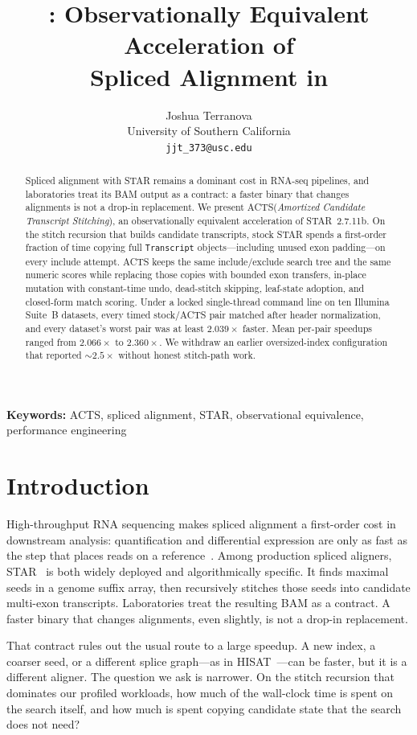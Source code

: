 \documentclass[11pt]{article}
\title{\ACTS: Observationally Equivalent Acceleration of\\
Spliced Alignment in \STAR}
\author{
  Joshua Terranova\\
  University of Southern California\\
  \texttt{jjt\_373@usc.edu}
}
\date{}
\newcommand{\STAR}{STAR\xspace}
\newcommand{\ACTS}{ACTS\xspace}
\newcommand{\Transcript}{\texttt{Transcript}\xspace}
\begin{document}
\maketitle

\begin{abstract}
Spliced alignment with \STAR remains a dominant cost in RNA-seq pipelines, and
laboratories treat its BAM output as a contract: a faster binary that changes
alignments is not a drop-in replacement.
We present \ACTS (\emph{Amortized Candidate Transcript Stitching}), an
observationally equivalent acceleration of \STAR~2.7.11b.
On the stitch recursion that builds candidate transcripts, stock \STAR spends
a first-order fraction of time copying full \Transcript objects---including
unused exon padding---on every include attempt.
\ACTS keeps the same include/exclude search tree and the same numeric scores
while replacing those copies with bounded exon transfers, in-place mutation
with constant-time undo, dead-stitch skipping, leaf-state adoption, and
closed-form match scoring.
Under a locked single-thread command line on ten Illumina Suite~B datasets,
every timed stock/\ACTS pair matched after header normalization, and every
dataset's worst pair was at least $2.039\times$ faster.
Mean per-pair speedups ranged from $2.066\times$ to $2.360\times$.
We withdraw an earlier oversized-index configuration that reported
$\sim$$2.5\times$ without honest stitch-path work.
\end{abstract}

\noindent\textbf{Keywords:} ACTS, spliced alignment, STAR, observational equivalence, performance engineering

\section{Introduction}
\label{sec:intro}

High-throughput RNA sequencing makes spliced alignment a first-order cost in
downstream analysis: quantification and differential expression are only as fast
as the step that places reads on a reference~\cite{love2014deseq2}.
Among production spliced aligners, \STAR~\cite{dobin2013star,dobin2015mapping}
is both widely deployed and algorithmically specific.
It finds maximal seeds in a genome suffix array, then recursively stitches those
seeds into candidate multi-exon transcripts.
Laboratories treat the resulting BAM as a contract.
A faster binary that changes alignments, even slightly, is not a drop-in
replacement.

That contract rules out the usual route to a large speedup.
A new index, a coarser seed, or a different splice graph---as in
HISAT~\cite{kim2015hisat}---can be faster, but it is a different aligner.
The question we ask is narrower.
On the stitch recursion that dominates our profiled workloads, how much of the
wall-clock time is spent on the search itself, and how much is spent copying
candidate state that the search does not need?
\end{document}
